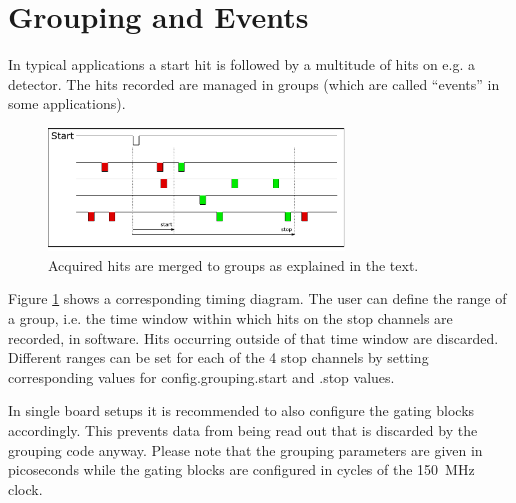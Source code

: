 \section{Grouping and Events}
\label{grouping}

In typical applications a start hit is followed by a multitude of hits on e.g. a detector. 
The hits recorded are managed in groups (which are called ``events'' in some applications). 
%
\begin{figure}[ht]
    \begin{center}
        \includegraphics[width=0.7\textwidth]{figures/grouping.pdf}
        \caption{Acquired hits are merged to groups as explained in the text.\label{fig:grouping}}
    \end{center}
\end{figure}
%
 
Figure \ref{fig:grouping} shows a corresponding timing diagram. The user can define the range of a group, i.e. the time window within which hits 
on the stop channels are recorded, in software. Hits occurring outside of that time window are discarded. 
 Different ranges can be set for each of the 4 stop channels by setting corresponding values for \textsf{config.grouping.start} and \textsf{.stop} values.


 In single board setups it is recommended to also configure the gating blocks accordingly. 
 This prevents data from being read out that is discarded by the grouping code anyway. 
 Please note that the grouping parameters are given in picoseconds while the gating blocks are configured in cycles of the 150~MHz clock.
